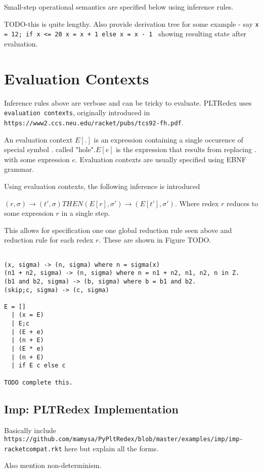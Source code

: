 Small-step operational semantics are specified below using inference rules.

TODO-this is quite lengthy. Also provide derivation tree for some example - say \texttt{x = 12; if x <= 20 x = x + 1 else x = x - 1 } showing resulting state after evaluation.


\section{Evaluation Contexts}

Inference rules above are verbose and can be tricky to evaluate. PLTRedex uses \texttt{evaluation contexts}, originally introduced in \texttt{https://www2.ccs.neu.edu/racket/pubs/tcs92-fh.pdf}. 

An evaluation context $E[.]$ is an expression containing a single occurence of special symbol $.$ called "hole".$E[e]$ is the expression that results from replacing $.$ with some expression $e$. Evaluation contexts are usually specified using EBNF grammar. 

Using evaluation contexts, the following inference is introduced

$(r, \sigma) \rightarrow (t\prime, \sigma) THEN (E[r], \sigma\prime) \rightarrow (E[t\prime], \sigma\prime)$. Where redex $r$ reduces to some expression $r$ in a single step.

This allows for specification one one global reduction rule seen above and reduction rule for each redex $r$. These are shown in Figure TODO.

\begin{lstlisting}

(x, sigma) -> (n, sigma) where n = sigma(x)
(n1 + n2, sigma) -> (n, sigma) where n = n1 + n2, n1, n2, n in Z.
(b1 and b2, sigma) -> (b, sigma) where b = b1 and b2.
(skip;c, sigma) -> (c, sigma)

E = []
  | (x = E)
  | E;c
  | (E + e)
  | (n + E)
  | (E * e)
  | (n + E)
  | if E c else c
 
TODO complete this.
\end{lstlisting}


\subsection{Imp: PLTRedex Implementation}

Basically include \texttt{https://github.com/mamysa/PyPltRedex/blob/master/examples/imp/imp-racketcompat.rkt} here but explain all the forms.

Also mention non-determinism.


